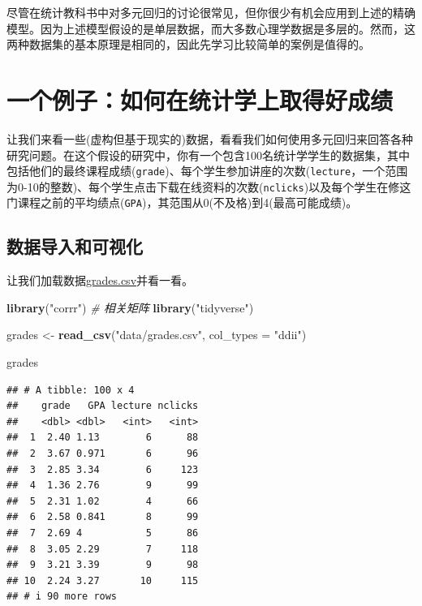 \documentclass[
]{book}
\newenvironment{Shaded}{\begin{snugshade}}{\end{snugshade}}
\newcommand{\AttributeTok}[1]{\textcolor[rgb]{0.13,0.29,0.53}{#1}}
\newcommand{\CommentTok}[1]{\textcolor[rgb]{0.56,0.35,0.01}{\textit{#1}}}
\newcommand{\FunctionTok}[1]{\textcolor[rgb]{0.13,0.29,0.53}{\textbf{#1}}}
\newcommand{\NormalTok}[1]{#1}
\newcommand{\OtherTok}[1]{\textcolor[rgb]{0.56,0.35,0.01}{#1}}
\newcommand{\StringTok}[1]{\textcolor[rgb]{0.31,0.60,0.02}{#1}}
\begin{document}
尽管在统计教科书中对多元回归的讨论很常见，但你很少有机会应用到上述的精确模型。因为上述模型假设的是单层数据，而大多数心理学数据是多层的。然而，这两种数据集的基本原理是相同的，因此先学习比较简单的案例是值得的。

\hypertarget{ux4e00ux4e2aux4f8bux5b50ux5982ux4f55ux5728ux7edfux8ba1ux5b66ux4e0aux53d6ux5f97ux597dux6210ux7ee9}{%
\section{一个例子：如何在统计学上取得好成绩}\label{ux4e00ux4e2aux4f8bux5b50ux5982ux4f55ux5728ux7edfux8ba1ux5b66ux4e0aux53d6ux5f97ux597dux6210ux7ee9}}

让我们来看一些(虚构但基于现实的)数据，看看我们如何使用多元回归来回答各种研究问题。在这个假设的研究中，你有一个包含100名统计学学生的数据集，其中包括他们的最终课程成绩(\texttt{grade})、每个学生参加讲座的次数(\texttt{lecture}，一个范围为0-10的整数)、每个学生点击下载在线资料的次数(\texttt{nclicks})以及每个学生在修这门课程之前的平均绩点(\texttt{GPA})，其范围从0(不及格)到4(最高可能成绩)。

\hypertarget{ux6570ux636eux5bfcux5165ux548cux53efux89c6ux5316}{%
\subsection{数据导入和可视化}\label{ux6570ux636eux5bfcux5165ux548cux53efux89c6ux5316}}

让我们加载数据\href{https://raw.githubusercontent.com/PsyTeachR/stat-models-v1/master/data/grades.csv}{grades.csv}并看一看。

\begin{Shaded}
\begin{Highlighting}[]
\FunctionTok{library}\NormalTok{(}\StringTok{"corrr"}\NormalTok{) }\CommentTok{\# 相关矩阵}
\FunctionTok{library}\NormalTok{(}\StringTok{"tidyverse"}\NormalTok{)}

\NormalTok{grades }\OtherTok{\textless{}{-}} \FunctionTok{read\_csv}\NormalTok{(}\StringTok{"data/grades.csv"}\NormalTok{, }\AttributeTok{col\_types =} \StringTok{"ddii"}\NormalTok{)}

\NormalTok{grades}
\end{Highlighting}
\end{Shaded}

\begin{verbatim}
## # A tibble: 100 x 4
##    grade   GPA lecture nclicks
##    <dbl> <dbl>   <int>   <int>
##  1  2.40 1.13        6      88
##  2  3.67 0.971       6      96
##  3  2.85 3.34        6     123
##  4  1.36 2.76        9      99
##  5  2.31 1.02        4      66
##  6  2.58 0.841       8      99
##  7  2.69 4           5      86
##  8  3.05 2.29        7     118
##  9  3.21 3.39        9      98
## 10  2.24 3.27       10     115
## # i 90 more rows
\end{verbatim}
\end{document}

